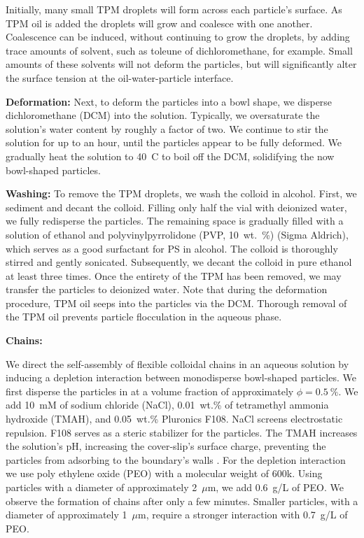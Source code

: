 \documentclass[aps,pre,preprint,superscriptaddress,nofootinbib]{revtex4-1}
\begin{document}
Initially, many small TPM droplets will form across each particle's surface.
As TPM oil is added the droplets will grow and coalesce with one another.
Coalescence can be induced, without continuing to grow the droplets, by adding trace amounts of solvent, such as toleune of dichloromethane, for example.
Small amounts of these solvents will not deform the particles, but will significantly alter the surface tension at the oil-water-particle interface.


\textbf{Deformation:}
Next, to deform the particles into a bowl shape, we disperse dichloromethane (DCM) into the solution. Typically, we oversaturate the solution's water content by roughly a factor of two.  We continue to stir the solution for up to an hour, until the particles appear to be fully deformed.  We gradually heat the solution to 40~C to boil off the DCM, solidifying the now bowl-shaped particles.

\textbf{Washing:}
To remove the TPM droplets, we wash the colloid in alcohol. First, we sediment and decant the colloid.  Filling only half the vial with deionized water, we fully redisperse the particles.  The remaining space is gradually filled with a solution of ethanol and polyvinylpyrrolidone (PVP, 10~wt.~\%) (Sigma Aldrich), which serves as a good surfactant for PS in alcohol.  The colloid is thoroughly stirred and gently sonicated.  Subsequently, we decant the colloid in pure ethanol at least three times.  Once the entirety of the TPM has been removed, we may transfer the particles to deionized water.  Note that during the deformation procedure, TPM oil seeps into the particles via the DCM.  Thorough removal of the TPM oil prevents particle flocculation in the aqueous phase.


\textbf{Chains:}

We direct the self-assembly of flexible colloidal chains in an aqueous solution by inducing a depletion interaction between monodisperse bowl-shaped particles.
We first disperse the particles in  at a volume fraction of approximately $\phi=0.5~\%$.
We add 10~mM of sodium chloride (NaCl), 0.01~wt.\% of tetramethyl ammonia hydroxide (TMAH), and 0.05~wt.\% Pluronics F108.
NaCl screens electrostatic repulsion.
F108 serves as  a steric stabilizer for the particles.
The TMAH increases the solution's pH, increasing the cover-slip's surface charge, preventing the particles from adsorbing to the boundary's walls \cite{Sacanna2010Lock}.
For the depletion interaction we use poly ethylene oxide (PEO) with a molecular weight of 600k.
Using particles with a diameter of approximately 2~$\mu$m, we add  0.6~g/L of PEO.
We observe the formation of chains after only a few minutes.
Smaller particles, with a diameter of approximately 1~$\mu$m, require a stronger interaction with 0.7~g/L of PEO.
\end{document}
